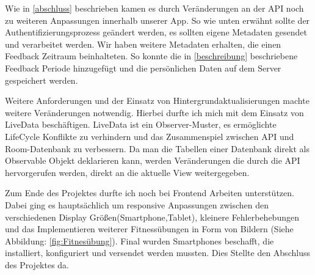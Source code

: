 Wie in \ref{abschluss} beschrieben kamen es durch Veränderungen an der API noch zu weiteren Anpassungen innerhalb unserer App. So wie unten erwähnt sollte der Authentifizierungsprozess geändert werden, es sollten eigene Metadaten gesendet und verarbeitet werden. Wir haben weitere Metadaten erhalten, die einen Feedback Zeitraum beinhalteten. So konnte die in \ref{beschreibung} beschriebene Feedback Periode hinzugefügt und die persönlichen Daten auf dem Server gespeichert werden.


Weitere Anforderungen und der Einsatz von Hintergrundaktualisierungen machte weitere Veränderungen notwendig. Hierbei durfte ich mich mit dem Einsatz von LiveData beschäftigen. LiveData ist ein Observer-Muster, es ermöglichte  LifeCycle Konflikte zu verhindern und das Zusammenspiel zwischen API und Room-Datenbank zu verbessern. Da man die Tabellen einer Datenbank direkt als Observable Objekt deklarieren kann, werden Veränderungen die durch die  API hervorgerufen werden, direkt  an die aktuelle View weitergegeben.

Zum Ende des Projektes durfte ich  noch bei Frontend Arbeiten unterstützen. Dabei ging es hauptsächlich um responsive Anpassungen zwischen den verschiedenen Display Größen(Smartphone,Tablet), kleinere Fehlerbehebungen und das Implementieren weiterer Fitnessübungen in Form von Bildern (Siehe Abbildung: \ref{fig:Fitnesübung}).
Final wurden Smartphones beschafft, die installiert, konfiguriert und versendet werden mussten. Dies Stellte den Abschluss des Projektes da.








